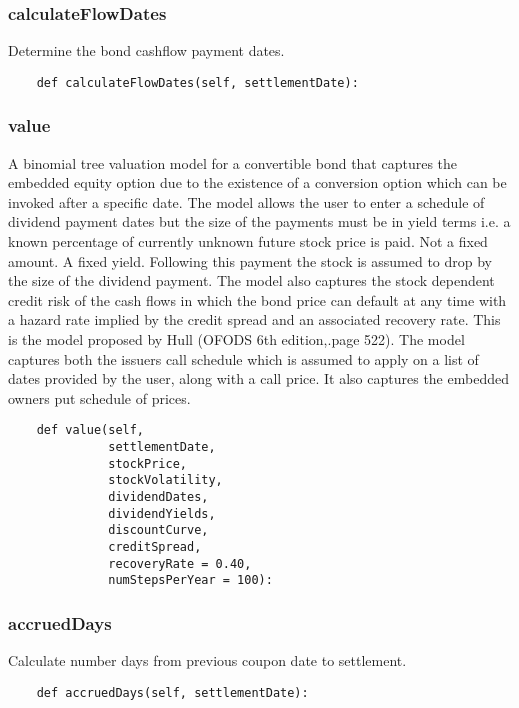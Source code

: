 \documentclass[twoside,11pt]{book}
\begin{document}
\subsubsection*{{\bf calculateFlowDates}}
Determine the bond cashflow payment dates.  

\begin{lstlisting}
    def calculateFlowDates(self, settlementDate):
\end{lstlisting}

\subsubsection*{{\bf value}}
 A binomial tree valuation model for a convertible bond that captures the embedded equity option due to the existence of a conversion option which can be invoked after a specific date.  The model allows the user to enter a schedule of dividend payment dates but the size of the payments must be in yield terms i.e. a known percentage of currently unknown future stock price is paid. Not a fixed amount. A fixed yield. Following this payment the stock is assumed to drop by the size of the dividend payment.  The model also captures the stock dependent credit risk of the cash flows in which the bond price can default at any time with a hazard rate implied by the credit spread and an associated recovery rate. This is the model proposed by Hull (OFODS 6th edition,.page 522).  The model captures both the issuers call schedule which is assumed to apply on a list of dates provided by the user, along with a call price. It also captures the embedded owners put schedule of prices.  

\begin{lstlisting}
    def value(self,
              settlementDate,
              stockPrice,
              stockVolatility,
              dividendDates,
              dividendYields,
              discountCurve,
              creditSpread,
              recoveryRate = 0.40,
              numStepsPerYear = 100):
\end{lstlisting}

\subsubsection*{{\bf accruedDays}}
Calculate number days from previous coupon date to settlement. 

\begin{lstlisting}
    def accruedDays(self, settlementDate):
\end{lstlisting}
\end{document}
